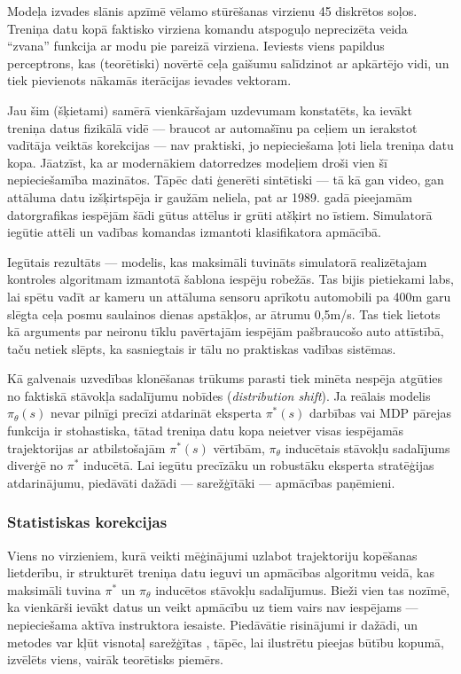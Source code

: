 \documentclass[12pt, a4paper]{article}
\numberwithin{equation}{section} %
\begin{document}
Modeļa izvades slānis apzīmē vēlamo stūrēšanas virzienu 45 diskrētos soļos. Treniņa datu kopā faktisko virziena komandu atspoguļo neprecizēta veida ``zvana'' funkcija ar modu pie pareizā virziena. Ieviests viens papildus perceptrons, kas (teorētiski) novērtē ceļa gaišumu salīdzinot ar apkārtējo vidi, un tiek pievienots nākamās iterācijas ievades vektoram.

Jau šim (šķietami) samērā vienkāršajam uzdevumam konstatēts, ka ievākt treniņa datus fizikālā vidē --- braucot ar automašīnu pa ceļiem un ierakstot vadītāja veiktās korekcijas --- nav praktiski, jo nepieciešama ļoti liela treniņa datu kopa. Jāatzīst, ka ar modernākiem datorredzes modeļiem droši vien šī nepieciešamība mazinātos. Tāpēc dati ģenerēti sintētiski --- tā kā gan video, gan attāluma datu izšķirtspēja ir gaužām neliela, pat ar 1989. gadā pieejamām datorgrafikas iespējām šādi gūtus attēlus ir grūti atšķirt no īstiem. Simulatorā iegūtie attēli un vadības komandas izmantoti klasifikatora apmācībā.

Iegūtais rezultāts --- modelis, kas maksimāli tuvināts simulatorā realizētajam kontroles algoritmam izmantotā šablona iespēju robežās. Tas bijis pietiekami labs, lai spētu vadīt ar kameru un attāluma sensoru aprīkotu automobili pa 400m garu slēgta ceļa posmu saulainos dienas apstākļos, ar ātrumu 0,5m/s. Tas tiek lietots kā arguments par neironu tīklu pavērtajām iespējām pašbraucošo auto attīstībā, taču netiek slēpts, ka sasniegtais ir tālu no praktiskas vadības sistēmas.

Kā galvenais uzvedības klonēšanas trūkums parasti tiek minēta nespēja atgūties no faktiskā stāvokļa sadalījumu nobīdes \cite{attia2018global} (\textit{distribution shift}). Ja reālais modelis $\pi_{\theta}(s)$ nevar pilnīgi precīzi atdarināt eksperta $\pi^*(s)$ darbības vai MDP pārejas funkcija ir stohastiska, tātad treniņa datu kopa neietver visas iespējamās trajektorijas ar atbilstošajām $\pi^*(s)$ vērtībām, $\pi_{\theta}$ inducētais stāvokļu sadalījums diverģē no $\pi^*$ inducētā. Lai iegūtu precīzāku un robustāku eksperta stratēģijas atdarinājumu, piedāvāti dažādi --- sarežģītāki --- apmācības paņēmieni.


\subsubsection{Statistiskas korekcijas}

Viens no virzieniem, kurā veikti mēģinājumi uzlabot trajektoriju kopēšanas lietderību, ir strukturēt treniņa datu ieguvi un apmācības algoritmu veidā, kas maksimāli tuvina $\pi^*$ un $\pi_{\theta}$ inducētos stāvokļu sadalījumus. Bieži vien tas nozīmē, ka vienkārši ievākt datus un veikt apmācību uz tiem vairs nav iespējams --- nepieciešama aktīva instruktora iesaiste. Piedāvātie risinājumi ir dažādi, un metodes var kļūt visnotaļ sarežģītas \cite{attia2018global}, tāpēc, lai ilustrētu pieejas būtību kopumā, izvēlēts viens, vairāk teorētisks piemērs.
\end{document}
